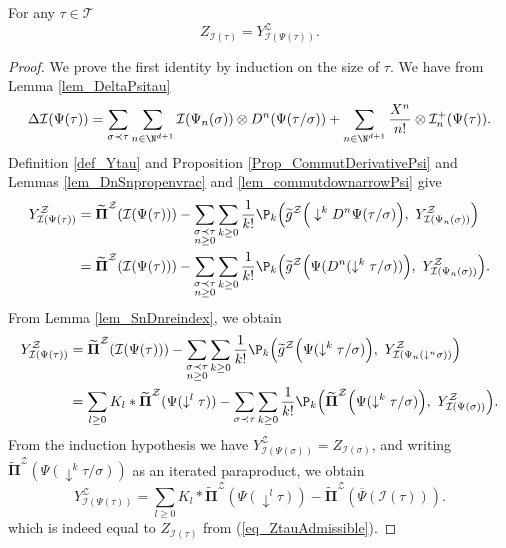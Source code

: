 \documentclass[11pt]{preprint}
\newcommand{\mcI}{\mathcal{I}}
\newcommand{\mcZ}{\mathcal{Z}}
\newcommand{\mcT}{\mathcal{T}}
\def\PPi{\boldsymbol{\Pi}}
\def\eqref#1{(\ref{#1})}
\begin{document}
	
	
	\begin{proposition}\label{prop_Ztau=YPsitau_integration}
		For any $\tau\in\mcT$ 
		$$
		Z_{\mcI(\tau)} = Y_{\mcI(\Psi(\tau))}^\mcZ.
		$$
	\end{proposition}
	\begin{proof}
		We prove the first identity by induction on the size of $\tau$.%
		We have from Lemma \ref{lem_DeltaPsitau}
		$$
		\Delta \mcI(\Psi(\tau)) = \sum_{\sigma\prec\tau}\sum_{n\in \N^{d+1}} \mcI(\Psi_n(\sigma)) \otimes D^n(\Psi(\tau/\sigma))  + \sum_{n \in \N^{d+1}} \frac{X^n}{n!} \otimes \mcI_n^+(\Psi(\tau)).
		$$
	Definition \ref{def_Ytau} and Proposition \ref{Prop_CommutDerivativePsi} and Lemmas \ref{lem_DnSnpropenvrac} and \ref{lem_commutdownarrowPsi} give 
		\begin{align*}
			Y_{\mcI(\Psi(\tau))}^\mcZ &= \widetilde{ \PPi}^\mcZ(\mcI(\Psi(\tau))) - \sum_{\substack{\sigma\prec\tau\\ n\geq0}}\sum_{k\geq 0} \frac{1}{k!} \P_k\Big(\widetilde{ g}^\mcZ\Big(\downarrow^k D^n\Psi( \tau/\sigma) \Big) ,  \,\, Y^\mcZ_{\mcI(\Psi_n(\sigma))} \Big)
			\\
			&=\widetilde{ \PPi}^\mcZ(\mcI(\Psi(\tau))) - \sum_{\substack{\sigma\prec\tau\\ n\geq0}}\sum_{k\geq 0} \frac{1}{k!} \P_k\Big(\widetilde{ g}^\mcZ\Big(\Psi(D^n (\downarrow^k\tau/\sigma)) \Big) ,  \,\, Y^\mcZ_{\mcI(\Psi_n(\sigma))} \Big).
		\end{align*}
		From Lemma \ref{lem_SnDnreindex}, we obtain 
			\begin{align*}
			Y_{\mcI(\Psi(\tau))}^\mcZ 
			&=
			\widetilde{ \PPi}^\mcZ(\mcI(\Psi(\tau))) - \sum_{\substack{\sigma\prec\tau\\ n\geq0}}\sum_{k\geq 0} \frac{1}{k!} \P_k\Big(\widetilde{ g}^\mcZ\Big(\Psi( \downarrow^k\tau/\sigma) \Big) ,  \,\, Y^\mcZ_{\mcI(\Psi_n(\downarrow^n\sigma))} \Big)
			\\
			&= \sum_{l\geq 0} K_l * \widetilde{ \PPi}^\mcZ(\Psi(\downarrow^l\tau)) - \sum_{\substack{\sigma\prec\tau\\ }}\sum_{k\geq 0} \frac{1}{k!} \P_k\Big(\widetilde{ \PPi}^\mcZ\Big(\Psi( \downarrow^k\tau/\sigma) \Big) ,  \,\, Y^\mcZ_{\mcI(\Psi(\sigma))} \Big).
		\end{align*}
		From the induction hypothesis we have $Y^\mcZ_{\mcI(\Psi(\sigma))}=Z_{\mcI(\sigma)}$, and writing $\widetilde{ \PPi}^\mcZ\left(\Psi( \downarrow^k\tau/\sigma)\right)$ as an iterated paraproduct, we obtain
		$$
		Y_{\mcI(\Psi(\tau))}^\mcZ = \sum_{l\geq 0} K_l * \widetilde{ \PPi}^\mcZ(\Psi(\downarrow^l\tau)) - \widetilde{\PPi}^\mcZ\left( \overline\Psi( \mcI(\tau) ) \right).
		$$
		which is indeed equal to $Z_{\mcI(\tau)}$ from \eqref{eq_ZtauAdmissible}.
	\end{proof}
	
\end{document}
